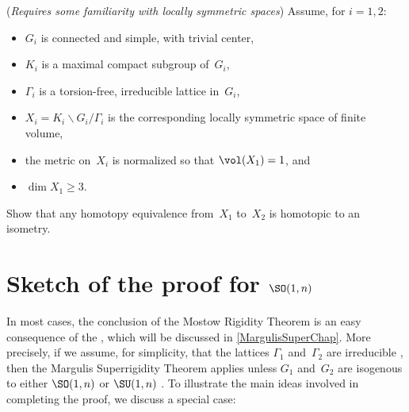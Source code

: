\begin{exercises}
\item \label{MostowGeomEx}
(\emph{Requires some familiarity with locally symmetric spaces})
Assume, for $i = 1,2$:
	\begin{itemize}
	\item $G_i$ is connected and simple, with trivial center,
	\item $K_i$ is a maximal compact subgroup of~$G_i$,
	\item $\Gamma_i$ is a torsion-free, irreducible lattice in~$G_i$,
	\item $X_i = K_i \backslash G_i / \Gamma_i$ is the corresponding locally symmetric space of finite volume,
	\item the metric on~$X_i$ is normalized so that $\vol(X_1) = 1$,
	and
	\item $\dim X_1 \ge 3$.
	\end{itemize}
Show that any homotopy equivalence from~$X_1$ to~$X_2$ is homotopic to an isometry.

\end{exercises}



\section{Sketch of the proof for \texorpdfstring{$\SO(1,\lowercase{n})$}{SO(1,n)} 
\texorpdfstring{\optional}{(optional)}} \label{MostowPfSect}

In most cases, the conclusion of the Mostow Rigidity Theorem  is an easy consequence of the , which will be discussed in \cref{MargulisSuperChap}.
More precisely, if we assume, for simplicity, that the lattices $\Gamma_1$ and~$\Gamma_2$ are irreducible , then the Margulis Superrigidity Theorem applies unless $G_1$ and~$G_2$ are isogenous to either $\SO(1,n)$ or $\SU(1,n)$ .
To illustrate the main ideas involved in completing the proof, we discuss a special case:

